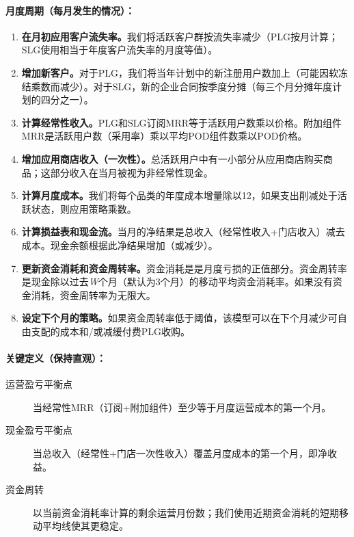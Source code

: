 \documentclass[11点, A4纸, 单面]{article}
\begin{document}
\paragraph{月度周期（每月发生的情况）：}
\begin{enumerate}
\item \textbf{在月初应用客户流失率。}我们将活跃客户群按流失率减少（PLG按月计算；SLG使用相当于年度客户流失率的月度等值）。
\item \textbf{增加新客户。}对于PLG，我们将当年计划中的新注册用户数加上（可能因软冻结乘数而减少）。对于SLG，新的企业合同按季度分摊（每三个月分摊年度计划的四分之一）。
\item \textbf{计算经常性收入。}PLG和SLG订阅MRR等于活跃用户数乘以价格。附加组件MRR是活跃用户数（采用率）乘以平均POD组件数乘以POD价格。
\item \textbf{增加应用商店收入（一次性）。}总活跃用户中有一小部分从应用商店购买商品；这部分收入在当月被视为非经常性现金。
\item \textbf{计算月度成本。}我们将每个品类的年度成本增量除以12，如果支出削减处于活跃状态，则应用策略乘数。
\item \textbf{计算损益表和现金流。}当月的净结果是总收入（经常性收入+门店收入）减去成本。现金余额根据此净结果增加（或减少）。
\item \textbf{更新资金消耗和资金周转率。}资金消耗是是月度亏损的正值部分。资金周转率是现金除以过去\emph{W}个月（默认为3个月）的移动平均资金消耗率。如果没有资金消耗，资金周转率为无限大。
\item \textbf{设定下个月的策略。}如果资金周转率低于阈值，该模型可以在下个月减少可自由支配的成本和/或减缓付费PLG收购。
\end{enumerate}


\paragraph{关键定义（保持直观）：}
\begin{description}
\item[运营盈亏平衡点] 当经常性MRR（订阅+附加组件）至少等于月度运营成本的第一个月。
\item[现金盈亏平衡点] 当总收入（经常性+门店一次性收入）覆盖月度成本的第一个月，即净收益。
\item[资金周转] 以当前资金消耗率计算的剩余运营月份数；我们使用近期资金消耗的短期移动平均线使其更稳定。
\end{description}
\end{document}
